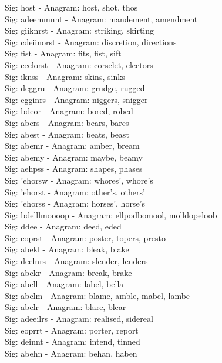 Sig: {host} - Anagram: host, shot, thos \\
Sig: {adeemmnnt} - Anagram: mandement, amendment \\
Sig: {giiknrst} - Anagram: striking, skirting \\
Sig: {cdeiinorst} - Anagram: discretion, directions \\
Sig: {fist} - Anagram: fits, fist, sift \\
Sig: {ceelorst} - Anagram: corselet, electors \\
Sig: {iknss} - Anagram: skins, sinks \\
Sig: {deggru} - Anagram: grudge, rugged \\
Sig: {egginrs} - Anagram: niggers, snigger \\
Sig: {bdeor} - Anagram: bored, robed \\
Sig: {abers} - Anagram: bears, bares \\
Sig: {abest} - Anagram: beats, beast \\
Sig: {abemr} - Anagram: amber, bream \\
Sig: {abemy} - Anagram: maybe, beamy \\
Sig: {aehpss} - Anagram: shapes, phases \\
Sig: {'ehorsw} - Anagram: whores', whore's \\
Sig: {'ehorst} - Anagram: other's, others' \\
Sig: {'ehorss} - Anagram: horses', horse's \\
Sig: {bdelllmoooop} - Anagram: ellpodbomool, molldopeloob \\
Sig: {ddee} - Anagram: deed, eded \\
Sig: {eoprst} - Anagram: poster, topers, presto \\
Sig: {abekl} - Anagram: bleak, blake \\
Sig: {deelnrs} - Anagram: slender, lenders \\
Sig: {abekr} - Anagram: break, brake \\
Sig: {abell} - Anagram: label, bella \\
Sig: {abelm} - Anagram: blame, amble, mabel, lambe \\
Sig: {abelr} - Anagram: blare, blear \\
Sig: {adeeilrs} - Anagram: realised, sidereal \\
Sig: {eoprrt} - Anagram: porter, report \\
Sig: {deinnt} - Anagram: intend, tinned \\
Sig: {abehn} - Anagram: behan, haben \\
